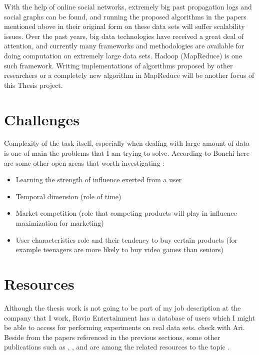\documentclass[english]{tktltiki}
\begin{document}
With the help of online social networks, extremely big past propagation logs and social graphs can be found, and running the proposed algorithms in the papers mentioned above in their original form on these data sets will suffer scalability issues. Over the past years, big data technologies have received a great deal of attention, and currently many frameworks and methodologies are available for doing computation on extremely large data sets. Hadoop (MapReduce) is one such framework. Writing implementations of algorithms proposed by other researchers or a completely new algorithm in MapReduce will be another focus of this Thesis project. 

\section{Challenges}
Complexity of the task itself, especially when dealing with large amount of data is one of main the problems that I am trying to solve. 
According to Bonchi \cite{Bon11} here are some other open areas that worth investigating :
\begin{itemize}
\item Learning the strength of influence exerted from a user
\item Temporal dimension (role of time)
\item Market competition (role that competing products will play in influence maximization for marketing)
\item User characteristics role and their tendency to buy certain products (for example teenagers are more likely to buy video games than seniors)
\end{itemize}

\section{Resources}
Although the thesis work is not going to be part of my job description at the company that I work, Rovio Entertainment has a database of users which I might be able to access for performing experiments on real data sets. {check with Ari}.
Beside from the papers referenced in the previous sections, some other publications such as \cite{domingo02}, \cite{goyal10}, and \cite{cheng13} are among the related resources to the topic .\\
\pagebreak



\lastpage

\pagestyle{empty}
\end{document}

